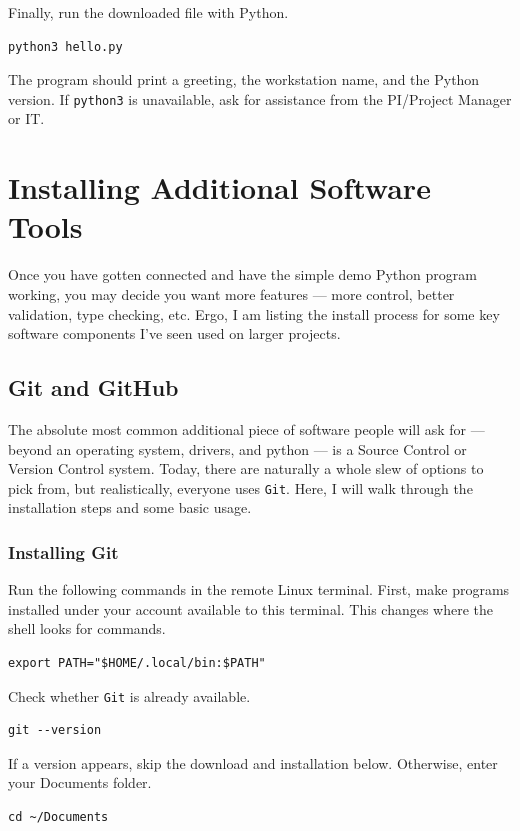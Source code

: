 \documentclass[12pt]{article}
\newcommand{\program}[1]{\begingroup\setlength{\fboxsep}{2pt}%
  \colorbox{ProgramBackground}{\texttt{#1}}\endgroup}
\newcommand{\inlinecode}[1]{\begingroup\setlength{\fboxsep}{2pt}%
  \colorbox{black!5}{\texttt{#1}}\endgroup}
\begin{document}
Finally, run the downloaded file with Python.
\begin{lstlisting}
python3 hello.py
\end{lstlisting}

The program should print a greeting, the workstation name, and the Python version. If \inlinecode{python3} is unavailable, ask for assistance from the PI/Project Manager or IT. 

\clearpage
\section{Installing Additional Software Tools}

Once you have gotten connected and have the simple demo Python program working, you may decide you want more features --- more control, better validation, type checking, etc. Ergo, I am listing the install process for some key software components I've seen used on larger projects.

\subsection{Git and GitHub}
The absolute most common additional piece of software people will ask for --- beyond an operating system, drivers, and python --- is a Source Control or Version Control system. Today, there are naturally a whole slew of options to pick from, but realistically, everyone uses \program{Git}. Here, I will walk through the installation steps and some basic usage.

\subsubsection*{Installing Git}

Run the following commands in the remote Linux terminal. First, make programs installed under your account available to this terminal. This changes where the shell looks for commands.
\begin{lstlisting}
export PATH="$HOME/.local/bin:$PATH"
\end{lstlisting}

Check whether \program{Git} is already available.
\begin{lstlisting}
git --version
\end{lstlisting}

If a version appears, skip the download and installation below. Otherwise, enter your Documents folder.
\begin{lstlisting}
cd ~/Documents
\end{lstlisting}
\end{document}
